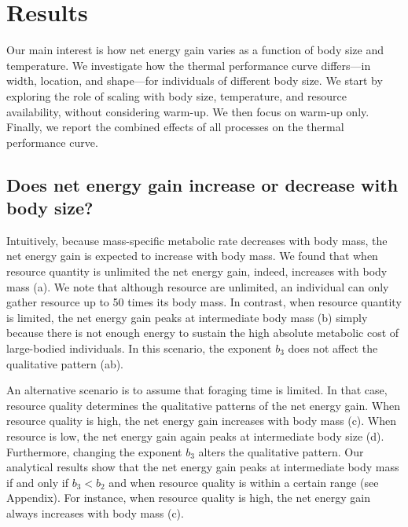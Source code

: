\section*{Results}

Our main interest is how net energy gain varies as a function of body size and temperature.
We investigate how the thermal performance curve differs---in width, location, and shape---for individuals of different body size.
We start by exploring the role of scaling with body size, temperature, and resource availability, without considering warm-up.
We then focus on warm-up only.
Finally, we report the combined effects of all processes on the thermal performance curve.


\subsection*{Does net energy gain increase or decrease with body size?}

Intuitively, because mass-specific metabolic rate decreases with body mass, the net energy gain is expected to increase with body mass.
We found that when resource quantity is unlimited the net energy gain, indeed, increases with body mass (a).
We note that although resource are unlimited, an individual can only gather resource up to 50 times its body mass.
In contrast, when resource quantity is limited, the net energy gain peaks at intermediate body mass (b) simply because there is not enough energy to sustain the high absolute metabolic cost of large-bodied individuals.
In this scenario, the exponent $b_3$ does not affect the qualitative pattern (ab).

An alternative scenario is to assume that foraging time is limited.
In that case, resource quality determines the qualitative patterns of the net energy gain.
When resource quality is high, the net energy gain increases with body mass (c).
When resource is low, the net energy gain again peaks at intermediate body size (d).
Furthermore, changing the exponent $b_3$ alters the qualitative pattern.
Our analytical results show that the net energy gain peaks at intermediate body mass if and only if $b_3 < b_2$ and when resource quality is within a certain range (see Appendix).
For instance, when resource quality is high, the net energy gain always increases with body mass (c).


